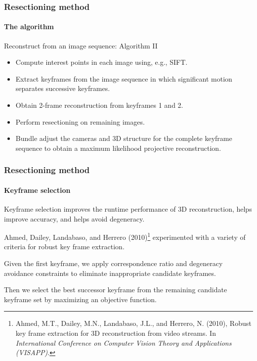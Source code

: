 \documentclass[aspectratio=169]{beamer}
\begin{document}
\begin{frame}
\frametitle{Resectioning method}
\framesubtitle{The algorithm}

\begin{block}{Reconstruct from an image sequence: Algorithm II}
\begin{itemize}
\item[(i)] Compute \alert{interest points} in each image using, e.g.,
  SIFT.
\item[(ii)] Extract \alert{keyframes} from the image sequence
  in which significant motion separates successive keyframes.
\item[(iii)] Obtain 2-frame reconstruction from keyframes 1 and 2.
\item[(iv)] Perform \alert{resectioning} on remaining images.
\item[(v)] \alert{Bundle adjust} the cameras and 3D structure for the
  complete keyframe sequence to obtain a maximum likelihood projective
  reconstruction.
\end{itemize}
\end{block}

\end{frame}


\begin{frame}
\frametitle{Resectioning method}
\framesubtitle{Keyframe selection}

Keyframe selection \alert{improves the runtime performance} of 3D
reconstruction, helps improve \alert{accuracy}, and helps avoid
\alert{degeneracy}.

\medskip

Ahmed, Dailey, Landabaso, and Herrero (2010)\footnote{ Ahmed, M.T.,
  Dailey, M.N., Landabaso, J.L., and Herrero, N. (2010), Robust key
  frame extraction for 3D reconstruction from video streams.  In
  \textit{International Conference on Computer Vision Theory and
    Applications (VISAPP)}.} experimented with a variety of criteria
for robust key frame extraction.

\medskip

Given the first keyframe, we apply \alert{correspondence ratio} and
\alert{degeneracy avoidance} constraints to eliminate inappropriate
candidate keyframes.

\medskip

Then we select the best successor keyframe from the remaining
candidate keyframe set by maximizing an objective function.

\end{frame}
\end{document}
